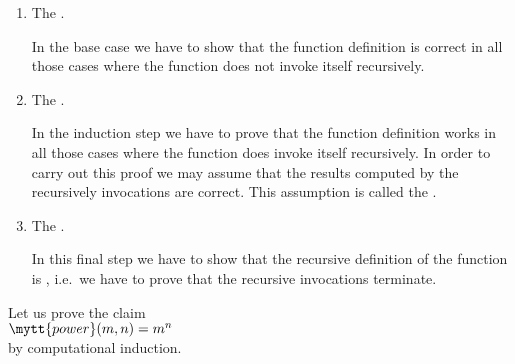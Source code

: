 \begin{enumerate}
\item The .

      In the base case we have to show that the function definition is correct in all those cases where the function
      does not invoke itself recursively.
\item The .

      In the induction step we have to prove that the function definition works in all those cases where
      the function does invoke itself recursively.  In order to carry out this proof we may
      assume that the results computed by the recursively invocations are correct.
      This assumption is called the .
\item The .

      In this final step we have to show that the recursive definition of the function is ,
      i.e.~we have to prove that the recursive invocations terminate.
\end{enumerate}
Let us prove the claim 
\\[0.2cm]
\hspace*{1.3cm}
 $\mytt{power}(m,n) = m^n$
\\[0.2cm] 
by computational induction.
